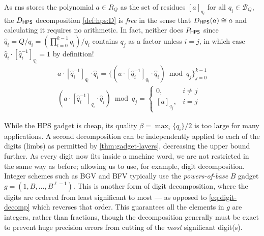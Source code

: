 \begin{remark}
    \label{rem:hps-optimization}
    As \gls{rns} stores the polynomial $a\in R_Q$ as the set of residues $[a]_{q_i}$ for all $q_i \in \mathcal{B}_{Q}$, the ${D}_{\mathsf{HPS}}$ decomposition \eqref{def:hps:D} is \emph{free} in the sense that ${D}_{\mathsf{HPS}}(a) \cong a$ and calculating it requires no arithmetic. In fact, neither does ${P}_{\mathsf{HPS}}$ since $\hat{q}_i = Q/q_i = (\prod_{l=0}^{k-1}q_l)/q_i$ contains $q_j$ as a factor unless $i=j$, in which case $\hat{q}_i\cdot[\hat{q}_i^{-1}]_{q_i} = 1$ by definition! \\
    \begin{gather*}
        a\cdot[\hat{q}^{-1}_i]_{q_i}\cdot\hat{q}_i = \{(a\cdot[\hat{q}_i^{-1}]_{q_i}\cdot\hat{q}_i) \bmod{q_j} \}_{j = 0}^{k-1} 
        \\
        (a\cdot[\hat{q}^{-1}_i]_{q_i}\cdot\hat{q}_i) \bmod q_j = 
        \begin{cases}
            0, & i \not= j\\
            [a]_{q_j}, & i = j
        \end{cases}
    \end{gather*}
\end{remark} 

While the HPS gadget is cheap, its quality $\beta = \max_i\{q_i\}/2$ is too large for many applications. A second decomposition can be independently applied to each of the digits (limbs) as permitted by \autoref{thm:gadget-layers}, decreasing the upper bound further. As every digit now fits inside a machine word, we are not restricted in the same way as before; allowing us to use, for example, digit decomposition. Integer schemes such as BGV and BFV typically use the \emph{powers-of-base} $B$ gadget $g = (1, B, \dots, B^{\ell-1})$. This is another form of digit decomposition, where the digits are ordered from least significant to most --- as opposed to \eqref{eq:digit-decomp} which reverses that order. This guarantees all the elements in $g$ are integers, rather than fractions, though the decomposition generally must be exact to prevent huge precision errors from cutting of the \emph{most} significant digit(s).